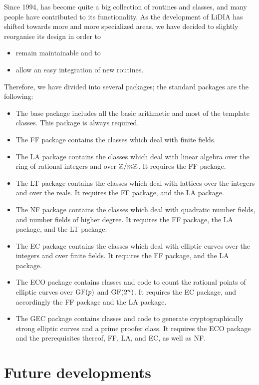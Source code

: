 Since 1994, \LiDIA has become quite a big collection of routines and classes, and many people
have contributed to its functionality.  As the development of LiDIA has shifted towards more and
more specialized areas, we have decided to slightly reorganise its design in order to
\begin{itemize}
\item remain maintainable and to
\item allow an easy integration of new routines.
\end{itemize}
Therefore, we have divided \LiDIA into several packages; the standard packages are the
following:
\begin{itemize}
\item The \LiDIA base package includes all the basic arithmetic and most of the template
  classes.  This package is always required.
\item The \LiDIA FF package contains the classes which deal with finite fields.
\item The \LiDIA LA package contains the classes which deal with linear algebra over the ring of
  rational integers and over $\mathbb{Z}/m\mathbb{Z}$.  It requires the \LiDIA FF package.
\item The \LiDIA LT package contains the classes which deal with lattices over the integers and
  over the reals.  It requires the \LiDIA FF package, and the \LiDIA LA package.
\item The \LiDIA NF package contains the classes which deal with quadratic number fields, and
  number fields of higher degree.  It requires the \LiDIA FF package, the \LiDIA LA package, and
  the \LiDIA LT package.
\item The \LiDIA EC package contains the classes which deal with elliptic curves over the
  integers and over finite fields.  It requires the \LiDIA FF package, and the \LiDIA LA
  package.
\item The \LiDIA ECO package contains classes and code to count the rational points of elliptic
  curves over $\mathrm{GF}(p)$ and $\mathrm{GF}(2^n)$.  It requires the \LiDIA EC package, and
  accordingly the \LiDIA FF package and the \LiDIA LA package.
\item The \LiDIA GEC package contains classes and code to generate
  cryptographically strong elliptic curves and a prime proofer class.
  It requires the \LiDIA ECO package
  and the prerequisites thereof, \LiDIA FF, \LiDIA LA, and \LiDIA EC, as well
  as \LiDIA NF.
\end{itemize}


\section{Future developments}

